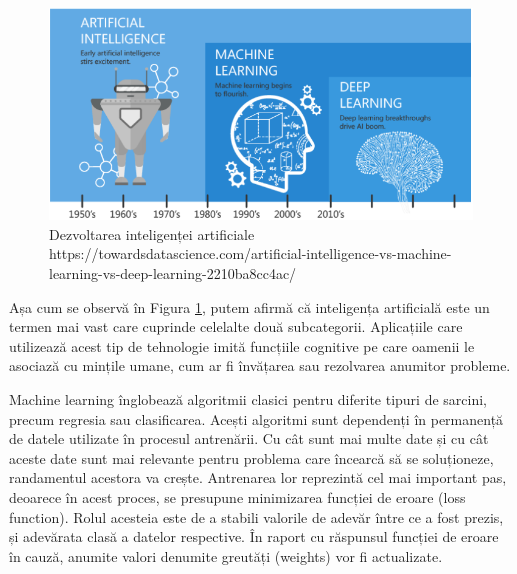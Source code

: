 \documentclass[a4paper, 12pt]{report}
\begin{document}
	\begin{figure}[h]
		\begin{center}
			\includegraphics[scale=0.8]{images/AI_ML_DL.png}
		\end{center}
		\caption{Dezvoltarea inteligenței artificiale\newline
			\hspace{\linewidth}https://towardsdatascience.com/artificial-intelligence-vs-machine-learning-vs-deep-learning-2210ba8cc4ac/}
		\label{fig:AI_ML_DL}
	\end{figure}
	
	Așa cum se observă în Figura \ref{fig:AI_ML_DL}, putem afirmă că inteligența artificială este un termen mai vast care cuprinde celelalte două subcategorii. Aplicațiile care utilizează acest tip de tehnologie imită funcțiile cognitive pe care oamenii le asociază cu mințile umane, cum ar fi învățarea sau rezolvarea anumitor probleme.
	
	Machine learning înglobează algoritmii clasici pentru diferite tipuri de sarcini, precum regresia sau clasificarea. Acești algoritmi sunt dependenți în permanență de datele utilizate în procesul antrenării. Cu cât sunt mai multe date și cu cât aceste date sunt mai relevante pentru problema care încearcă să se soluționeze, randamentul acestora va crește. Antrenarea lor reprezintă cel mai important pas, deoarece în acest proces, se presupune minimizarea funcției de eroare (loss function). Rolul acesteia este de a stabili valorile de adevăr între ce a fost prezis, și adevărata clasă a datelor respective. În raport cu răspunsul funcției de eroare în cauză, anumite valori denumite greutăți (weights) vor fi actualizate.
	
\end{document}

